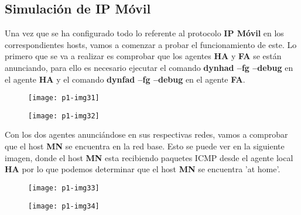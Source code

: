 \documentclass[10pt]{article}
\begin{document}
\subsection{Simulación de IP Móvil}
Una vez que se ha configurado todo lo referente al protocolo \textbf{IP Móvil} en los correspondientes hosts, vamos a comenzar a probar el funcionamiento de este. Lo primero que se va a realizar es comprobar que los agentes \textbf{HA} y \textbf{FA} se están anunciando, para ello es necesario ejecutar el comando \textbf{dynhad --fg --debug} en el agente \textbf{HA} y el comando \textbf{dynfad --fg --debug} en el agente \textbf{FA}. \\

\begin{figure}[H]
	\begin{center}
 		\texttt{[image: p1-img31]}
	\end{center} 
\end{figure}

\begin{figure}[H]
	\begin{center}
 		\texttt{[image: p1-img32]}
	\end{center} 
\end{figure}

Con los dos agentes anunciándose en sus respectivas redes, vamos a comprobar que el host \textbf{MN} se encuentra en la red base. Esto se puede ver en la siguiente imagen, donde el host \textbf{MN} esta recibiendo paquetes ICMP desde el agente local \textbf{HA} por lo que podemos determinar que el host \textbf{MN} se encuentra 'at home'.\\ 

\begin{figure}[H]
	\begin{center}
 		\texttt{[image: p1-img33]}
	\end{center} 
\end{figure}

\begin{figure}[H]
	\begin{center}
 		\texttt{[image: p1-img34]}
	\end{center} 
\end{figure}
\end{document}
